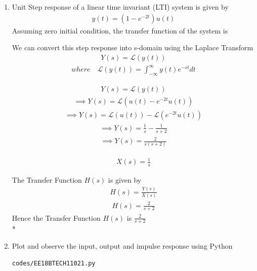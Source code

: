 \begin{enumerate}[label=\thesection.\arabic*.,ref=\thesection.\theenumi]

\item
Unit Step response of a linear time invariant (LTI) system is given by 
\begin{align}
y(t) = (1 - e^{-2t})u(t)
\end{align}
Assuming zero initial condition, the transfer function of the system is

\solution We can convert this step response into s-domain using the Laplace Transform
\begin{align}
Y(s) = \mathcal{L}(y(t))
\end{align}
\begin{align}
where \quad \mathcal{L}(y(t))= \int_{-\infty}^{\infty} y(t)e^{-st} dt
\end{align}

\begin{align}
Y(s) = \mathcal{L}(y(t))
\end{align}
\begin{align}
\implies Y(s) = \mathcal{L}(u(t) - e^{-2t}u(t))
\end{align}
\begin{align}
\implies Y(s) = \mathcal{L}(u(t)) - \mathcal{L}(e^{-2t}u(t))
\end{align}
\begin{align}
\implies Y(s) = \frac{1}{s} - \frac{1}{s+2}
\end{align}
\begin{align}
\implies Y(s) = \frac{2}{s(s+2)}
\end{align}

\begin{align}
X(s) = \frac{1}{s}
\end{align}

The Transfer Function $H(s)$ is given by
\begin{align}
H(s) = \frac{Y(s)}{X(s)}
\end{align}
\begin{align}
H(s) = \frac{2}{s+2}
\end{align}
Hence the Transfer Function $H(s)$ is $\frac{2}{s+2}$\\*


\item Plot and observe the input, output and impulse response using Python
\solution
\begin{lstlisting}
codes/EE18BTECH11021.py
\end{lstlisting}


\end{enumerate}
